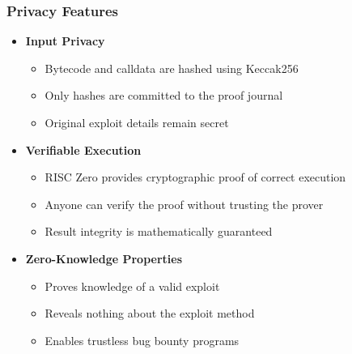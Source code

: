 \documentclass{beamer}
\begin{document}
\begin{frame}
\frametitle{Privacy Features}
\begin{itemize}
    \item \textbf{Input Privacy}
        \begin{itemize}
            \item Bytecode and calldata are hashed using Keccak256
            \item Only hashes are committed to the proof journal
            \item Original exploit details remain secret
        \end{itemize}
    \item \textbf{Verifiable Execution}
        \begin{itemize}
            \item RISC Zero provides cryptographic proof of correct execution
            \item Anyone can verify the proof without trusting the prover
            \item Result integrity is mathematically guaranteed
        \end{itemize}
    \item \textbf{Zero-Knowledge Properties}
        \begin{itemize}
            \item Proves knowledge of a valid exploit
            \item Reveals nothing about the exploit method
            \item Enables trustless bug bounty programs
        \end{itemize}
\end{itemize}
\end{frame}
\end{document}
